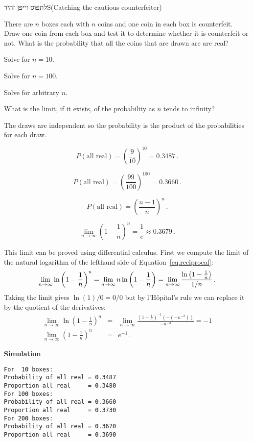 \begin{prob}{לתפוס זייפן זהיר}{S}{(Catching the cautious counterfeiter)}

There are $n$ boxes each with $n$ coins and one coin in each box is counterfeit. Draw one coin from each box and test it to determine whether it is counterfeit or not. What is the probability that all the coins that are drawn are are real?

 Solve for $n=10$.

 Solve for $n=100$.

 Solve for arbitrary $n$.

 What is the limit, if it exists, of the probability as $n$ tends to infinity?
\end{prob}

\solution{}

The draws are independent so the probability is the product of the probabilities for each draw.

\[
P(\textrm{all real}) = \left(\frac{9}{10}\right)^{10}=0.3487\,.
\]


\[
P(\textrm{all real}) = \left(\frac{99}{100}\right)^{100}=0.3660\,.
\]

\[
P(\textrm{all real}) = \left(\frac{n-1}{n}\right)^{n}\,.
\]

\begin{equation}\label{eq.reciprocal}
\lim_{n\rightarrow\infty}\left(1-\frac{1}{n}\right)^{n}=\frac{1}{e}\approx 0.3679\,.
\end{equation}

This limit can be proved using differential calculus. First we compute the limit of the natural logarithm of the lefthand side of Equation~\ref{eq.reciprocal}:
\[
\lim_{n\rightarrow\infty}\ln \left(1-\frac{1}{n}\right)^{n}=
  \lim_{n\rightarrow\infty}n\ln \left(1-\frac{1}{n}\right)=
  \lim_{n\rightarrow\infty} \displaystyle\frac{\ln\left(1-\frac{1}{n}\right)}{1/n}\,.
\]
Taking the limit gives $\ln(1)/0=0/0$ but by l'H\^{o}pital's rule we can replace it by the quotient of the derivatives:
\begin{eqnarray*}
\lim_{n\rightarrow\infty}\ln \left(1-\frac{1}{n}\right)^{n}&=&\lim_{n\rightarrow\infty}\frac{\left(1-\frac{1}{n}\right)^{-1}(-(-n^{-2}))}{-n^{-2}}=-1\\
\lim_{n\rightarrow\infty}\left(1-\frac{1}{n}\right)^{n}&=&e^{-1}\,.
\end{eqnarray*}

\textbf{Simulation}
\begin{verbatim}
For  10 boxes:
Probability of all real = 0.3487
Proportion all real     = 0.3480
For 100 boxes:
Probability of all real = 0.3660
Proportion all real     = 0.3730
For 200 boxes:
Probability of all real = 0.3670
Proportion all real     = 0.3690
\end{verbatim}

